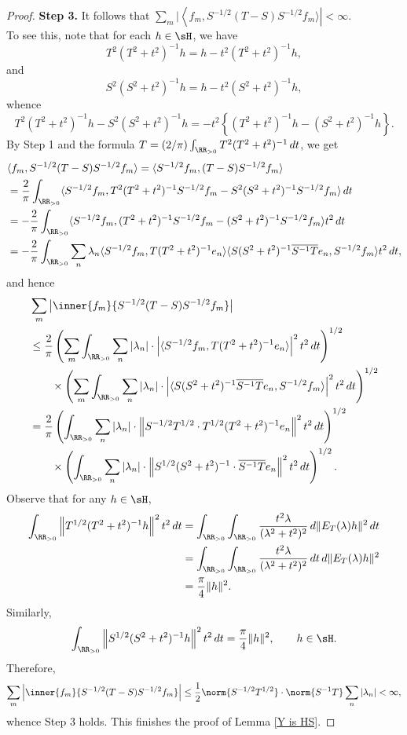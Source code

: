 \documentclass[12pt,draft]{article}
\theoremstyle{plain}
\numberwithin{equation}{section}
\theoremstyle{remark}
\begin{document}
\begin{proof}
\textbf{Step 3.} It follows that $\sum_m|\left\langle f_m,S^{-1/2}(T-S)S^{-1/2}f_m\rangle\right|<\infty$.\\
To see this, note that for each $h\in\sH$, we have
\[
T^2(T^2+t^2)^{-1}h = h-t^2(T^2+t^2)^{-1}h,
\]
and
\[
S^2(S^2+t^2)^{-1}h = h-t^2(S^2+t^2)^{-1}h,
\]
whence
\[
T^2(T^2+t^2)^{-1}h - S^2(S^2+t^2)^{-1}h = -t^2\left\{(T^2+t^2)^{-1}h-(S^2+t^2)^{-1}h\right\}.
\]
By Step 1 and the formula $T=(2/\pi)\int_{\RR_{>0}}T^2(T^2+t^2)^{-1}\,dt$, we get
\begin{align*}
&\langle f_m,S^{-1/2}(T-S)S^{-1/2}f_m\rangle = \langle S^{-1/2}f_m,(T-S)S^{-1/2}f_m\rangle\\
&= \frac{2}{\pi}\int_{\RR_{>0}}\langle S^{-1/2}f_m,T^2(T^2+t^2)^{-1}S^{-1/2}f_m-S^2(S^2+t^2)^{-1}S^{-1/2}f_m\rangle\,dt\\
&= -\frac{2}{\pi}\int_{\RR_{>0}}\langle S^{-1/2}f_m,(T^2+t^2)^{-1}S^{-1/2}f_m-(S^2+t^2)^{-1}S^{-1/2}f_m\rangle t^2\,dt\\
&= -\frac{2}{\pi}\int_{\RR_{>0}}\sum_n
\lambda_n\langle S^{-1/2}f_m,T(T^2+t^2)^{-1}e_n\rangle\langle S(S^2+t^2)^{-1}\overline{S^{-1}T}e_n,S^{-1/2}f_m\rangle t^2\,dt,
\end{align*}
and hence
\begin{align*}
&\sum_m \big| \inner{f_m}{S^{-1/2}(T-S)S^{-1/2}f_m} \big|  \\
&\leq \frac{2}{\pi} \left( \sum_m\int_{\RR_{>0}}\sum_n|\lambda_n|\cdot\left|\langle S^{-1/2}f_m,T(T^2+t^2)^{-1}e_n\rangle\right|^2t^2\,dt\right)^{1/2}\\
& \qquad 
\times\left(\sum_m\int_{\RR_{>0}}\sum_n|\lambda_n|\cdot\left|\langle S(S^2+t^2)^{-1}\overline{S^{-1}T}e_n,S^{-1/2}f_m\rangle\right|^2t^2\,dt\right)^{1/2}\\
&= \frac{2}{\pi}\left(\int_{\RR_{>0}}\sum_n|\lambda_n|\cdot\left\|S^{-1/2}T^{1/2}\cdot T^{1/2}(T^2+t^2)^{-1}e_n\right\|^2t^2\,dt\right)^{1/2}\\
& \qquad 
\times\left(\int_{\RR_{>0}}\sum_n|\lambda_n|\cdot\left\|S^{1/2}(S^2+t^2)^{-1}\cdot\overline{S^{-1}T}e_n\right\|^2t^2\,dt\right)^{1/2}.
\end{align*}
Observe that for any $h\in\sH$,
\begin{align*}
\int_{\RR_{>0}} \left\|T^{1/2}(T^2+t^2)^{-1}h\right\|^2t^2\,dt
& = \int_{\RR_{>0}}\int_{\RR_{>0}}\frac{t^2\lambda}{(\lambda^2+t^2)^2}\,d\|E_T(\lambda)h\|^2\,dt \\
& = \int_{\RR_{>0}}\int_{\RR_{>0}}\frac{t^2\lambda}{(\lambda^2+t^2)^2}\,dt\,d\|E_T(\lambda)h\|^2 \\
& = \frac{\pi}{4}\|h\|^2.
\end{align*}
Similarly, 
\[
\int_{\RR_{>0}}\left\|S^{1/2}(S^2+t^2)^{-1}h\right\|^2t^2\,dt =  \frac{\pi}{4}\|h\|^2, \qquad h\in\sH.
\]
Therefore, 
\[
\sum_m\left| \inner{f_m}{S^{-1/2}(T-S)S^{-1/2}f_m} \right| 
\leq \frac{1}{2} \norm{S^{-1/2}T^{1/2}} \cdot\norm{S^{-1}T} \sum_n |\lambda_n|
< \infty,
\]
whence Step 3 holds.
This finishes the proof of Lemma \ref{Y is HS}.
\end{proof}
\end{document}
